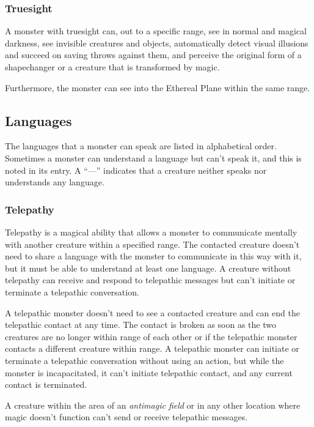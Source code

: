 \documentclass[
]{article}
\begin{document}
\hypertarget{truesight}{%
\subsubsection{Truesight}\label{truesight}}

A monster with truesight can, out to a specific range, see in normal and
magical darkness, see invisible creatures and objects, automatically
detect visual illusions and succeed on saving throws against them, and
perceive the original form of a shapechanger or a creature that is
transformed by magic.

Furthermore, the monster can see into the Ethereal Plane within the same
range.

\hypertarget{languages}{%
\subsection{Languages}\label{languages}}

The languages that a monster can speak are listed in alphabetical order.
Sometimes a monster can understand a language but can't speak it, and
this is noted in its entry. A ``---'' indicates that a creature neither
speaks nor understands any language.

\hypertarget{telepathy}{%
\subsubsection{Telepathy}\label{telepathy}}

Telepathy is a magical ability that allows a monster to communicate
mentally with another creature within a specified range. The contacted
creature doesn't need to share a language with the monster to
communicate in this way with it, but it must be able to understand at
least one language. A creature without telepathy can receive and respond
to telepathic messages but can't initiate or terminate a telepathic
conversation.

A telepathic monster doesn't need to see a contacted creature and can
end the telepathic contact at any time. The contact is broken as soon as
the two creatures are no longer within range of each other or if the
telepathic monster contacts a different creature within range. A
telepathic monster can initiate or terminate a telepathic conversation
without using an action, but while the monster is incapacitated, it
can't initiate telepathic contact, and any current contact is
terminated.

A creature within the area of an \emph{antimagic field} or in any other
location where magic doesn't function can't send or receive telepathic
messages.
\end{document}
